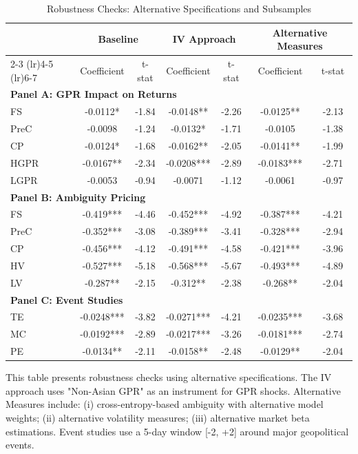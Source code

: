 \documentclass[preprint,12pt,authoryear]{elsarticle}
\begin{document}
\begin{table}[htbp]
\centering
\caption{Robustness Checks: Alternative Specifications and Subsamples}
\label{tab:robustness}
\begin{threeparttable}
\begin{tabular*}{\textwidth}{@{\extracolsep{\fill}} lcccccc @{\extracolsep{\fill}}}
\toprule
& \multicolumn{2}{c}{Baseline} & \multicolumn{2}{c}{IV Approach} & \multicolumn{2}{c}{Alternative Measures} \\
\cmidrule(lr){2-3} \cmidrule(lr){4-5} \cmidrule(lr){6-7}
& Coefficient & t-stat & Coefficient & t-stat & Coefficient & t-stat \\
\midrule
\midrule
\multicolumn{7}{l}{\textbf{Panel A: GPR Impact on Returns}} \\
FS & -0.0112* & -1.84 & -0.0148** & -2.26 & -0.0125** & -2.13 \\
PreC & -0.0098 & -1.24 & -0.0132* & -1.71 & -0.0105 & -1.38 \\
CP & -0.0124* & -1.68 & -0.0162** & -2.05 & -0.0141** & -1.99 \\
HGPR & -0.0167** & -2.34 & -0.0208*** & -2.89 & -0.0183*** & -2.71 \\
LGPR & -0.0053 & -0.94 & -0.0071 & -1.12 & -0.0061 & -0.97 \\
\midrule
\multicolumn{7}{l}{\textbf{Panel B: Ambiguity Pricing}} \\
FS & -0.419*** & -4.46 & -0.452*** & -4.92 & -0.387*** & -4.21 \\
PreC & -0.352*** & -3.08 & -0.389*** & -3.41 & -0.328*** & -2.94 \\
CP & -0.456*** & -4.12 & -0.491*** & -4.58 & -0.421*** & -3.96 \\
HV & -0.527*** & -5.18 & -0.568*** & -5.67 & -0.493*** & -4.89 \\
LV & -0.287** & -2.15 & -0.312** & -2.38 & -0.268** & -2.04 \\
\midrule
\multicolumn{7}{l}{\textbf{Panel C: Event Studies}} \\
TE & -0.0248*** & -3.82 & -0.0271*** & -4.21 & -0.0235*** & -3.68 \\
MC & -0.0192*** & -2.89 & -0.0217*** & -3.26 & -0.0181*** & -2.74 \\
PE & -0.0134** & -2.11 & -0.0158** & -2.48 & -0.0129** & -2.04 \\
\bottomrule
\end{tabular*}
\begin{tablenotes}[flushleft]
\small
\item[] This table presents robustness checks using alternative specifications. The IV approach uses "Non-Asian GPR" as an instrument for GPR shocks. Alternative Measures include: (i) cross-entropy-based ambiguity with alternative model weights; (ii) alternative volatility measures; (iii) alternative market beta estimations. Event studies use a 5-day window [-2, +2] around major geopolitical events.

\end{tablenotes}
\end{threeparttable}
\end{table}
\end{document}
